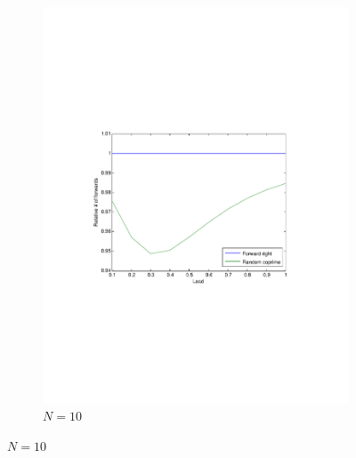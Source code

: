 \documentclass[10pt,a4paper]{article}
\begin{document}
\begin{figure}
\centering
        \begin{subfigure}[b]{0.9\textwidth}
			\centering
			\includegraphics[clip=true, trim=9em 24em 9em 24em,width=\textwidth]{resources/plotrandcoprime.pdf}
			\caption{$N=10$}
			\label{validcp10}
        \end{subfigure}


\end{figure}
\end{document}
